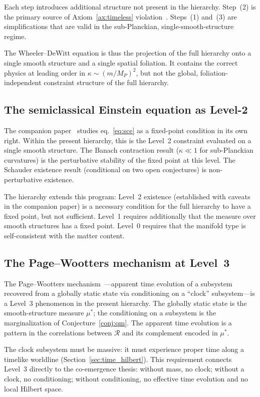 \documentclass[12pt,a4paper]{article}
\theoremstyle{definition}
\theoremstyle{remark}
\begin{document}
Each step introduces additional structure not present in the hierarchy.
Step~(2) is the primary source of Axiom~\ref{ax:timeless}
violation~\cite{kuchar}. Steps~(1) and~(3) are simplifications that are
valid in the sub-Planckian, single-smooth-structure regime.

The Wheeler--DeWitt equation is thus the projection of the full hierarchy
onto a single smooth structure and a single spatial foliation. It
contains the correct physics at leading order in $\kappa \sim (m/M_P)^2$,
but not the global, foliation-independent constraint structure of the
full hierarchy.

\subsection{The semiclassical Einstein equation as Level-2}

The companion paper~\cite{fixed_point} studies eq.~\eqref{eq:sce} as a
fixed-point condition in its own right. Within the present hierarchy,
this is the Level~2 constraint evaluated on a single smooth structure.
The Banach contraction result ($\kappa \ll 1$ for sub-Planckian
curvatures) is the perturbative stability of the fixed point at this
level. The Schauder existence result (conditional on two open conjectures)
is non-perturbative existence.

The hierarchy extends this program: Level~2 existence (established with
caveats in the companion paper) is a necessary condition for the full
hierarchy to have a fixed point, but not sufficient. Level~1 requires
additionally that the measure over smooth structures has a fixed point.
Level~0 requires that the manifold type is self-consistent with the
matter content.

\subsection{The Page--Wootters mechanism at Level~3}

The Page--Wootters mechanism~\cite{page_wootters}---apparent time
evolution of a subsystem recovered from a globally static state via
conditioning on a ``clock'' subsystem---is a Level~3 phenomenon in the
present hierarchy. The globally static state is the smooth-structure
measure $\mu^*$; the conditioning on a subsystem is the marginalization
of Conjecture~\ref{conj:qm}. The apparent time evolution is a pattern
in the correlations between $\mathcal{R}$ and its complement encoded in
$\mu^*$.

The clock subsystem must be massive: it must experience proper time
along a timelike worldline (Section~\ref{sec:time_hilbert}). This
requirement connects Level~3 directly to the co-emergence thesis:
without mass, no clock; without a clock, no conditioning; without
conditioning, no effective time evolution and no local Hilbert space.
\end{document}
